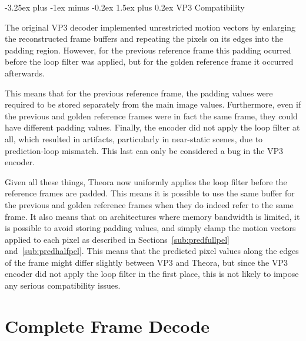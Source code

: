 \documentclass[9pt,letterpaper]{book}
\makeatletter
\numberwithin{equation}{chapter}
\numberwithin{figure}{chapter}
\numberwithin{table}{chapter}
\renewcommand{\paragraph}{\@startsection{paragraph}{4}{0ex}%
 {-3.25ex plus -1ex minus -0.2ex}%
 {1.5ex plus 0.2ex}%
 {\normalfont\normalsize\bfseries}}
\makeatother
\begin{document}
\paragraph{VP3 Compatibility}

The original VP3 decoder implemented unrestricted motion vectors by enlarging
 the reconstructed frame buffers and repeating the pixels on its edges into the
 padding region.
However, for the previous reference frame this padding ocurred before the loop
 filter was applied, but for the golden reference frame it occurred afterwards.

This means that for the previous reference frame, the padding values were
 required to be stored separately from the main image values.
Furthermore, even if the previous and golden reference frames were in fact the
 same frame, they could have different padding values.
Finally, the encoder did not apply the loop filter at all, which resulted in
 artifacts, particularly in near-static scenes, due to prediction-loop
 mismatch.
This last can only be considered a bug in the VP3 encoder.

Given all these things, Theora now uniformly applies the loop filter before
 the reference frames are padded.
This means it is possible to use the same buffer for the previous and golden
 reference frames when they do indeed refer to the same frame.
It also means that on architectures where memory bandwidth is limited, it is
 possible to avoid storing padding values, and simply clamp the motion vectors
 applied to each pixel as described in Sections~\ref{sub:predfullpel}
 and~\ref{sub:predhalfpel}.
This means that the predicted pixel values along the edges of the frame might
 differ slightly between VP3 and Theora, but since the VP3 encoder did not
 apply the loop filter in the first place, this is not likely to impose any
 serious compatibility issues.

\section{Complete Frame Decode}
\end{document}
